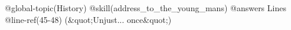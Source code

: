 @global-topic(History)
@skill(address_to_the_young_mans)
@answers
Lines @line-ref(45-48) (&quot;Unjust... once&quot;)
